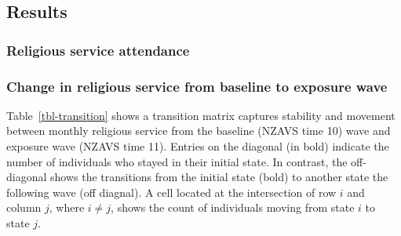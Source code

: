 \documentclass[
  singlecolumn]{article}
\begin{document}
\newpage{}

\newpage{}

\subsection{Results}\label{results}

\subsubsection{Religious service
attendance}\label{religious-service-attendance}

\subsubsection{Change in religious service from baseline to exposure
wave}\label{change-in-religious-service-from-baseline-to-exposure-wave}

Table~\ref{tbl-transition} shows a transition matrix captures stability
and movement between monthly religious service from the baseline (NZAVS
time 10) wave and exposure wave (NZAVS time 11). Entries on the diagonal
(in bold) indicate the number of individuals who stayed in their initial
state. In contrast, the off-diagonal shows the transitions from the
initial state (bold) to another state the following wave (off diagnal).
A cell located at the intersection of row \(i\) and column \(j\), where
\(i \neq j\), shows the count of individuals moving from state \(i\) to
state \(j\).
\end{document}
